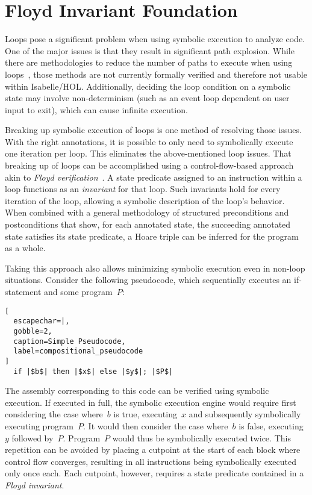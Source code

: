 \section{Floyd Invariant Foundation}\label{se:cfg_invariant}
Loops pose a significant problem when using symbolic execution to analyze code.
One of the major issues is that they result in significant path explosion.
While there are methodologies to reduce the number of paths to execute
when using loops~\citep{saxena2009lese,obdrzalek2011efficient},
those methods are not currently formally verified
and therefore not usable within Isabelle/HOL.
Additionally, deciding the loop condition on a symbolic state
may involve non-determinism (such as an event loop dependent on user input to exit),
which can cause infinite execution.

Breaking up symbolic execution of loops is one method of resolving those issues.
With the right annotations,
it is possible to only need to symbolically execute one iteration per loop.
This eliminates the above-mentioned loop issues.
That breaking up of loops can be accomplished using a control-flow-based approach
akin to \emph{Floyd verification}~\citep{floyd1967assigning}.
A state predicate assigned to an instruction within a loop
functions as an \emph{invariant} for that loop.
Such invariants hold for every iteration of the loop,
allowing a symbolic description of the loop's behavior.
When combined with a general methodology
of structured preconditions and postconditions that show,
for each annotated state, the succeeding annotated state satisfies its state predicate,
a Hoare triple can be inferred for the program as a whole.

Taking this approach also allows minimizing symbolic execution
even in non-loop situations.
Consider the following pseudocode,
which sequentially executes an if-statement and some program~$P$:
\begin{lstlisting}[
  escapechar=|,
  gobble=2,
  caption=Simple Pseudocode,
  label=compositional_pseudocode
]
  if |$b$| then |$x$| else |$y$|; |$P$|
\end{lstlisting}
The assembly corresponding to this code can be verified using symbolic execution.
If executed in full, the symbolic execution engine
would require first considering the case where~$b$ is true,
executing~$x$ and subsequently symbolically executing program~$P$.
It would then consider the case where~$b$ is false, executing~$y$ followed by~$P$.
Program~$P$ would thus be symbolically executed twice.
This repetition can be avoided
by placing a cutpoint at the start of each block where control flow converges,
resulting in all instructions being symbolically executed only once each.
Each cutpoint, however, requires a state predicate contained
in a \emph{Floyd invariant}.

